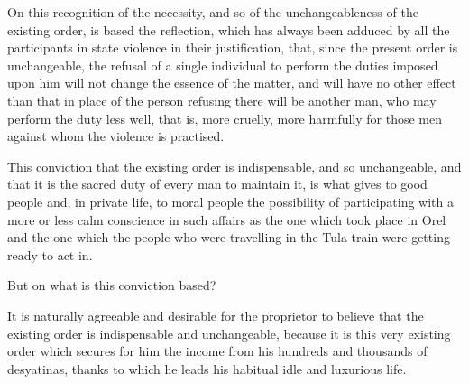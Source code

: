 \documentclass{book}
\begin{document}
On this recognition of the necessity, and so of the unchangeableness of the existing order, is based the reflection, which has always been adduced by all the participants in state violence in their justification, that, since the present order is unchangeable, the refusal of a single individual to perform the duties imposed upon him will not change the essence of the matter, and will have no other effect than that in place of the person refusing there will be another man, who may perform the duty less well, that is, more cruelly, more harmfully for those men against whom the violence is practised.

This conviction that the existing order is indispensable, and so unchangeable, and that it is the sacred duty of every man to maintain it, is what gives to good people and, in private life, to moral people the possibility of participating with a more or less calm conscience in such affairs as the one which took place in Orel and the one which the people who were travelling in the Tula train were getting ready to act in.

But on what is this conviction based?

It is naturally agreeable and desirable for the proprietor to believe that the existing order is indispensable and unchangeable, because it is this very existing order which secures for him the income from his hundreds and thousands of desyatinas, thanks to which he leads his habitual idle and luxurious life.
\end{document}
